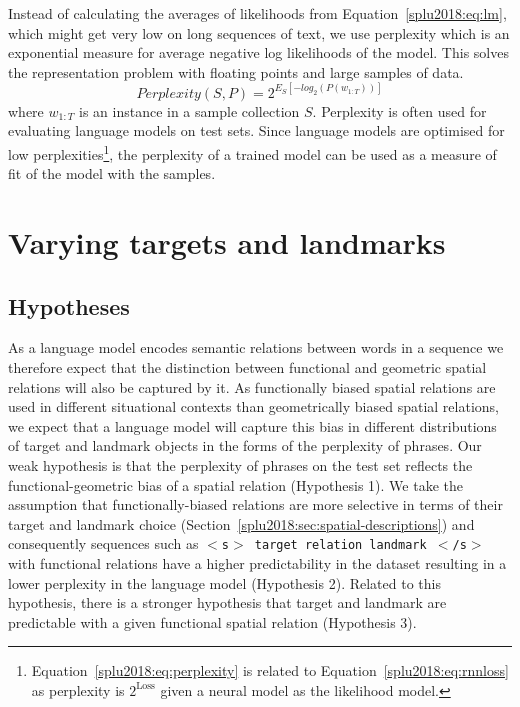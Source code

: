 Instead of calculating the averages of
likelihoods from Equation~\ref{splu2018:eq:lm}, which might get very low on long sequences of text, we use perplexity which is an exponential measure for average negative log
likelihoods of the model. This solves the representation problem with
floating points and large samples of data.
\begin{equation}\label{splu2018:eq:perplexity}
  Perplexity(S, P) = 2^{E_S [ -log_2(P(w_{1:T})) ]} %
\end{equation}
\noindent where $w_{1:T}$ is an instance in a sample collection $S$. Perplexity is often used for evaluating language models on test sets. Since
language models are optimised for low perplexities\footnote{Equation~\ref{splu2018:eq:perplexity} is related to Equation~\ref{splu2018:eq:rnnloss} as perplexity is $2^{\textrm{Loss}}$ given a neural model as the likelihood model.}, %
the perplexity of a trained
model can be used as a measure of fit of the model with the samples.


\section{Varying targets and landmarks}\label{splu2018:sec:plain-perplexity}



\subsection{Hypotheses}


As a language model encodes semantic relations between words in a
sequence we therefore expect that the distinction between functional
and geometric spatial relations will also be captured by it.  As
functionally biased spatial relations are used in different
situational contexts than geometrically biased spatial relations, we
expect that a language model will capture this bias in different
distributions of target and landmark objects in the forms of the
perplexity of phrases. Our weak hypothesis is that the perplexity of phrases on the test set reflects the
functional-geometric bias of a spatial relation (Hypothesis 1). We take the assumption that functionally-biased
relations are more selective in terms of their target and landmark
choice (Section~\ref{splu2018:sec:spatial-descriptions}) and consequently sequences such as \texttt{$<$s$>$ target
  relation landmark $<$/s$>$} with functional relations have a higher predictability in the
dataset resulting in a lower perplexity in the language model
(Hypothesis 2). Related to this hypothesis, there is a stronger hypothesis that target and landmark are predictable with a given functional spatial relation (Hypothesis 3).








